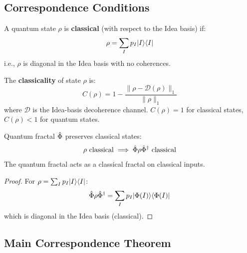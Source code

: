 \subsection{Correspondence Conditions}

\begin{definition}
\label{def:classical-state}
A quantum state $\rho$ is \textbf{classical} (with respect to the Idea basis) if:
\[
\rho = \sum_I p_I |I\rangle\langle I|
\]
i.e., $\rho$ is diagonal in the Idea basis with no coherences.
\end{definition}

\begin{definition}
\label{def:classicality}
The \textbf{classicality} of state $\rho$ is:
\[
C(\rho) = 1 - \frac{\|\rho - \mathcal{D}(\rho)\|_1}{\|\rho\|_1}
\]
where $\mathcal{D}$ is the Idea-basis decoherence channel. $C(\rho) = 1$ for classical states, $C(\rho) < 1$ for quantum states.
\end{definition}

\begin{proposition}
\label{prop:classical-preservation}
Quantum fractal $\hat{\Phi}$ preserves classical states:
\[
\rho \text{ classical} \implies \hat{\Phi}\rho\hat{\Phi}^\dagger \text{ classical}
\]
The quantum fractal acts as a classical fractal on classical inputs.
\end{proposition}

\begin{proof}
For $\rho = \sum_I p_I |I\rangle\langle I|$:
\[
\hat{\Phi}\rho\hat{\Phi}^\dagger = \sum_I p_I |\Phi(I)\rangle\langle \Phi(I)|
\]
which is diagonal in the Idea basis (classical).
\end{proof}

\subsection{Main Correspondence Theorem}

